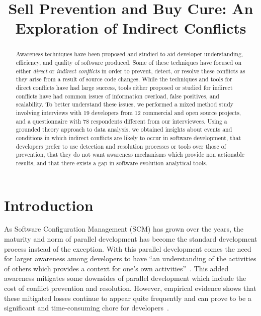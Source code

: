 \documentclass[conference]{IEEEtran}
\begin{document}
\title{Sell Prevention and Buy Cure: An Exploration of Indirect Conflicts}

\author{
}

\maketitle

\begin{abstract}

Awareness techniques have been proposed and studied to aid developer
understanding, efficiency, and quality of software produced. Some of these techniques have focused
on either \textit{direct} or
\textit{indirect conflicts} in order to prevent, detect, or resolve these conflicts as they arise
from a result of source code changes. While the techniques and tools for direct conflicts have had
large success, tools either proposed or studied for indirect conflicts have had common issues of
information overload, false positives, and scalability. To better understand these issues,
we performed a mixed method study involving interviews with 19 developers from 12 commercial and open
source projects, and a questionnaire with 78 respondents different from our interviewees. Using a grounded theory approach to data analysis,
we obtained insights about events and conditions in which indirect conflicts are likely to occur in
software development, that developers prefer to use detection and resolution processes or tools
over those of prevention, that they do not want awareness mechanisms which provide non actionable results,
and that there exists a gap in software evolution analytical tools.

\end{abstract}

\section{Introduction}
\label{sec:intro}

As Software Configuration Management (SCM) has grown over the years, the maturity and norm of parallel
development has become the standard development process instead of the exception. With this parallel development
comes the need for larger awareness among developers to have ``an understanding of the activities of others
which provides a context for one's own activities''~\cite{Dourish:1992:ACS}. This added awareness
mitigates some downsides of parallel development which include the cost of conflict prevention and resolution. However,
empirical evidence shows that these mitigated losses continue to appear quite frequently and can prove to be a significant
and time-consuming chore for developers~\cite{Perry:2001:PCL}.
\end{document}
